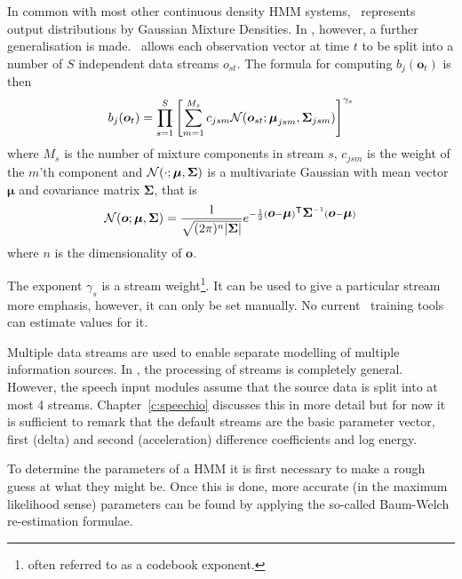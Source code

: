 In common with most other
continuous density HMM systems, \HTK\ represents output distributions
by Gaussian Mixture Densities.  
In \HTK, however, a further
generalisation is made.  \HTK\ allows each observation vector at time $t$
to be split into a number of $S$ independent data streams $o_{st}$.  The
formula for computing $b_{j}(\bm{o}_t)$ is then
\begin{equation} \label{e:8}
  b_{j}({\mbox{\boldmath $o$}}_t) = \prod_{s=1}^S \left[
     \sum_{m=1}^{M_s} c_{jsm} {\cal N}({\mbox{\boldmath $o$}}_{st};
                    {\mbox{\boldmath $\mu$}}_{jsm}, {\mbox{\boldmath $\Sigma$}}_{jsm})
  \right]^{\gamma_s}
\end{equation}
where $M_s$ is the number of mixture components in stream $s$, $c_{jsm}$
is the weight of the $m$'th component and 
${\cal N}(\cdot; {\mbox{\boldmath $\mu$}}, {\mbox{\boldmath $\Sigma$}})$ is a multivariate Gaussian with
mean vector $\bm{\mu}$ and covariance matrix $\bm{\Sigma}$,
that is
\begin{equation}
{\cal N}({\mbox{\boldmath $o$}}; {\mbox{\boldmath $\mu$}}, {\mbox{\boldmath $\Sigma$}}) =
       \frac{1}{\sqrt{(2 \pi)^n | {\mbox{\boldmath $\Sigma$}} |}} 
       e^{- \frac{1}{2}({\mbox{\boldmath $o$}}-{\mbox{\boldmath $\mu$}})^{\scriptstyle\sf T} {\mbox{\boldmath $\Sigma$}}^{-1}({\mbox{\boldmath $o$}}-{\mbox{\boldmath $\mu$}})}
\end{equation}
where $n$ is the dimensionality of $\bm{o}$.

The exponent $\gamma_s$ is a stream weight\footnote{often 
referred to as a codebook exponent.}.  It 
can be used to give a particular stream more emphasis, however,
it can only be set manually.  No current \HTK\ training tools 
can estimate values for it. 

Multiple data streams are used to
enable separate modelling of multiple information sources.  In
\HTK, the processing of streams is completely general.  However,
the speech input modules assume that the 
source data is split into at most 4 streams.  Chapter~\ref{c:speechio}
discusses this in more detail but for now it is sufficient to
remark that the default streams are the
basic parameter vector, first (delta) and second (acceleration)
difference coefficients and log energy.


To determine the parameters of a HMM it is first necessary to make
a rough guess at what they might be.  Once this is done, more
accurate (in the maximum likelihood sense) parameters
can be found by applying the so-called 
Baum-Welch re-estimation
formulae.  

